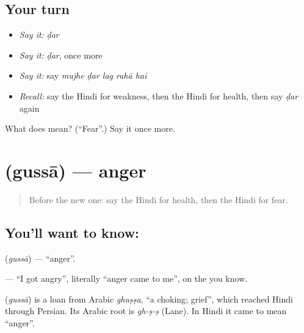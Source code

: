 \subsection*{Your turn}
\begin{itemize}
\raggedright
  \item \emph{Say it:} \emph{ḍar}
  \item \emph{Say it:} \emph{ḍar}, once more
  \item \emph{Say it:} say \emph{mujhe ḍar lag rahā hai}
  \item \emph{Recall:} say the Hindi for weakness, then the Hindi for health, then say \emph{ḍar} again
\end{itemize}

\begin{tcolorbox}[breakable,colback=teal!4,colframe=teal!35!black,title={Before you move on}]
What does  mean? (\textquotedblleft{}Fear\textquotedblright{}.) Say it once more.
\end{tcolorbox}
\section[\texorpdfstring{\hi{गुस्सा} (gussā)}{गुस्सा (gussā)}]{ (gussā) — anger}

\label{lesson:HI-C108-gussa}



\begin{quote}
Before the new one: say the Hindi for health, then the Hindi for fear.
\end{quote}

\subsection*{You'll want to know: }
\textbf{} (\emph{gussā}) — \textquotedblleft{}anger\textquotedblright{}.

\textbf{  } — \textquotedblleft{}I got angry\textquotedblright{}, literally \textquotedblleft{}anger came to me\textquotedblright{}, on the \textbf{} you know.

\begin{cousinweb}
\textbf{} (\emph{gussā}) is a loan from Arabic \emph{ghuṣṣa}, \textquotedblleft{}a choking; grief\textquotedblright{}, which reached Hindi through Persian. Its Arabic root is \emph{gh-ṣ-ṣ} (Lane). In Hindi it came to mean \textquotedblleft{}anger\textquotedblright{}.
\end{cousinweb}

